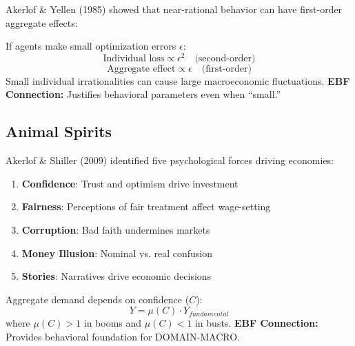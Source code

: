 Akerlof \& Yellen (1985) showed that near-rational behavior can have first-order aggregate effects:

\begin{axiom}
\label{ax:ga5}
If agents make small optimization errors $\epsilon$:
\begin{equation}
\text{Individual loss} \propto \epsilon^2 \quad \text{(second-order)}
\end{equation}
\begin{equation}
\text{Aggregate effect} \propto \epsilon \quad \text{(first-order)}
\end{equation}
Small individual irrationalities can cause large macroeconomic fluctuations.
\textbf{EBF Connection:} Justifies behavioral parameters even when ``small.''
\end{axiom}

\subsection{Animal Spirits}

Akerlof \& Shiller (2009) identified five psychological forces driving economies:

\begin{enumerate}
    \item \textbf{Confidence}: Trust and optimism drive investment
    \item \textbf{Fairness}: Perceptions of fair treatment affect wage-setting
    \item \textbf{Corruption}: Bad faith undermines markets
    \item \textbf{Money Illusion}: Nominal vs. real confusion
    \item \textbf{Stories}: Narratives drive economic decisions
\end{enumerate}

\begin{axiom}
\label{ax:ga6}
Aggregate demand depends on confidence ($C$):
\begin{equation}
Y = \mu(C) \cdot Y_{fundamental}
\end{equation}
where $\mu(C) > 1$ in booms and $\mu(C) < 1$ in busts.
\textbf{EBF Connection:} Provides behavioral foundation for DOMAIN-MACRO.
\end{axiom}

